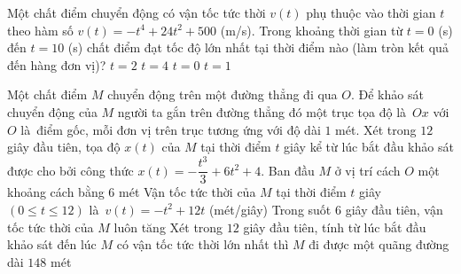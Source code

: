 \begin{ex}%
	 Một chất điểm chuyển động có vận tốc tức thời $v(t)$ phụ thuộc vào thời gian $t$ theo hàm số $v(t)=-t^4+24t^2+500$ (m/s). Trong khoảng thời gian từ $t=0$ (s) đến $t=10$ (s) chất điểm đạt tốc độ lớn nhất tại thời điểm nào (làm tròn kết quả đến hàng đơn vị)?
	 \choice
		 {$t=2$}
		 {\True $t=4$}
		{$t=0$} 
		 {$t=1$}
\end{ex}

\begin{ex}%
	Một chất điểm $M$ chuyển động trên một đường thẳng đi qua $O$. Để khảo sát chuyển động của $M$ người ta gắn trên đường thẳng đó một trục tọa độ  là~$Ox$ với $O$ là~điểm gốc, mỗi đơn vị trên trục tương ứng với độ dài $1$ mét. Xét trong $12$ giây đầu tiên, tọa độ $x(t)$ của $M$ tại thời điểm $t$ giây kể từ lúc bắt đầu khảo sát được cho bởi công thức $x(t)=-\dfrac{t^3}{3}+6t^2+4$.
	 \choiceTF
		{Ban  đầu $M$ ở vị trí cách $O$ một khoảng cách bằng $6$ mét}
		{\True Vận tốc tức thời của $M$ tại thời điểm  $t$ giây $(0 \leq t \leq 12)$ là~$v(t)=-t^2+12t$ (mét/giây)}
		{\True Trong suốt $6$ giây đầu tiên, vận tốc tức thời của  $M$ luôn tăng}
		{\True Xét trong $12$ giây đầu tiên, tính từ lúc bắt đầu khảo  sát đến lúc $M$ có vận tốc tức thời lớn nhất thì $M$ đi được một quãng đường dài $148$ mét}
\end{ex}


